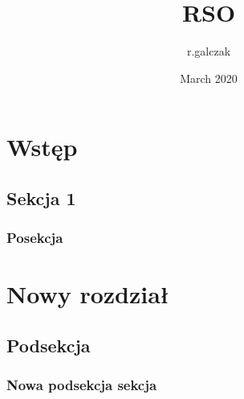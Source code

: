 \documentclass{report}
\title{RSO}
\author{r.galczak}
\date{March 2020}
\begin{document}
\maketitle

\chapter*{Wstęp}
\section{Sekcja 1}

\subsection{Posekcja}

\chapter*{Nowy rozdział}

\section{Podsekcja}

\subsection{Nowa podsekcja sekcja}
\end{document}
